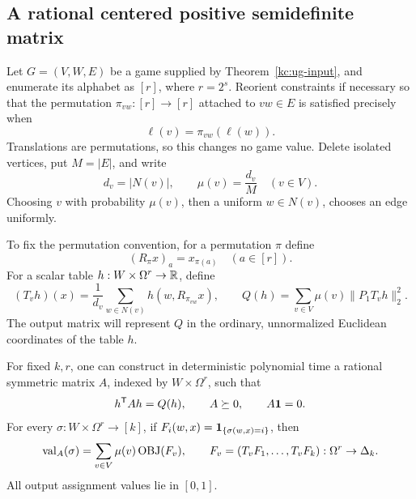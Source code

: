 \subsection{A rational centered positive semidefinite matrix}

Let \(G=(V,W,E)\) be a game supplied by
Theorem~\ref{kc:ug-input}, and enumerate its alphabet as
\([r]\), where \(r=2^s\). Reorient constraints if necessary so that
the permutation \(\pi_{vw}:[r]\to[r]\) attached to \(vw\in E\)
is satisfied precisely when
\[
 \ell(v)=\pi_{vw}(\ell(w)).
\]
Translations are permutations, so this changes no game value.
Delete isolated vertices, put \(M=|E|\), and write
\[
 d_v=|N(v)|,\qquad \mu(v)=\frac{d_v}{M}\quad(v\in V).
\]
Choosing \(v\) with probability \(\mu(v)\), then a uniform
\(w\in N(v)\), chooses an edge uniformly.

To fix the permutation convention, for a permutation \(\pi\) define
\[
 (R_\pi x)_a=x_{\pi(a)}\quad(a\in[r]).
\]
For a scalar table \(h:W\times\Omega^r\to\mathbb R\), define
\begin{equation}\label{kc:averaging}
 (T_vh)(x)=\frac1{d_v}
       \sum_{w\in N(v)}h(w,R_{\pi_{vw}}x),
 \qquad
 Q(h)=\sum_{v\in V}\mu(v)\|P_1T_vh\|_2^2 .
\end{equation}
The output matrix will represent \(Q\) in the ordinary,
unnormalized Euclidean coordinates of the table \(h\).

\begin{lemma}\label{kc:matrix}
For fixed \(k,r\), one can construct in deterministic polynomial
time a rational symmetric matrix \(A\), indexed by
\(W\times\Omega^r\), such that
\[
 h^{\mathsf T}Ah=Q(h),\qquad A\succeq0,\qquad A\mathbf 1=0 .
\]
For every \(\sigma:W\times\Omega^r\to[k]\), if
\(F_i(w,x)=\mathbf 1_{\{\sigma(w,x)=i\}}\), then
\begin{equation}\label{kc:objective-identity}
 \operatorname{val}_A(\sigma)=
 \sum_{v\in V}\mu(v)\operatorname{OBJ}(F_v),\qquad
 F_v=(T_vF_1,\ldots,T_vF_k):\Omega^r\to\Delta_k.
\end{equation}
All output assignment values lie in \([0,1]\).
\end{lemma}

